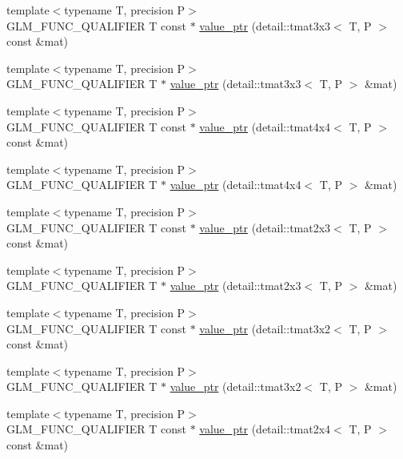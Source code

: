 \begin{CompactItemize}
\item 
{\footnotesize template$<$typename T, precision P$>$ }\\GLM\_\-FUNC\_\-QUALIFIER T const $\ast$ \hyperlink{group__gtc__type__ptr_g78aceb3dc479cf7745bc5a0d9f751504}{value\_\-ptr} (detail::tmat3x3$<$ T, P $>$ const \&mat)
\item 
{\footnotesize template$<$typename T, precision P$>$ }\\GLM\_\-FUNC\_\-QUALIFIER T $\ast$ \hyperlink{group__gtc__type__ptr_ge90c54e1a61d5ad0417d3c1a7800dfdc}{value\_\-ptr} (detail::tmat3x3$<$ T, P $>$ \&mat)
\item 
{\footnotesize template$<$typename T, precision P$>$ }\\GLM\_\-FUNC\_\-QUALIFIER T const $\ast$ \hyperlink{group__gtc__type__ptr_gcb2a7024434ab32998c6ade8ec0c0e4b}{value\_\-ptr} (detail::tmat4x4$<$ T, P $>$ const \&mat)
\item 
{\footnotesize template$<$typename T, precision P$>$ }\\GLM\_\-FUNC\_\-QUALIFIER T $\ast$ \hyperlink{group__gtc__type__ptr_g5f34b63d9c6322a3a61f15ee63768304}{value\_\-ptr} (detail::tmat4x4$<$ T, P $>$ \&mat)
\item 
{\footnotesize template$<$typename T, precision P$>$ }\\GLM\_\-FUNC\_\-QUALIFIER T const $\ast$ \hyperlink{group__gtc__type__ptr_g76ad4707fac9af56b7eaea2c9b6019fb}{value\_\-ptr} (detail::tmat2x3$<$ T, P $>$ const \&mat)
\item 
{\footnotesize template$<$typename T, precision P$>$ }\\GLM\_\-FUNC\_\-QUALIFIER T $\ast$ \hyperlink{group__gtc__type__ptr_g12dda3f2717411f15a1a317a82113f14}{value\_\-ptr} (detail::tmat2x3$<$ T, P $>$ \&mat)
\item 
{\footnotesize template$<$typename T, precision P$>$ }\\GLM\_\-FUNC\_\-QUALIFIER T const $\ast$ \hyperlink{group__gtc__type__ptr_g3ad2904b61a8c3fe50ccb6222e6e928c}{value\_\-ptr} (detail::tmat3x2$<$ T, P $>$ const \&mat)
\item 
{\footnotesize template$<$typename T, precision P$>$ }\\GLM\_\-FUNC\_\-QUALIFIER T $\ast$ \hyperlink{group__gtc__type__ptr_gd4e46790704d514a05d86164af942d72}{value\_\-ptr} (detail::tmat3x2$<$ T, P $>$ \&mat)
\item 
{\footnotesize template$<$typename T, precision P$>$ }\\GLM\_\-FUNC\_\-QUALIFIER T const $\ast$ \hyperlink{group__gtc__type__ptr_g9efd0cc6b3e12ec8953d9a96e8b750b0}{value\_\-ptr} (detail::tmat2x4$<$ T, P $>$ const \&mat)

\end{CompactItemize}
